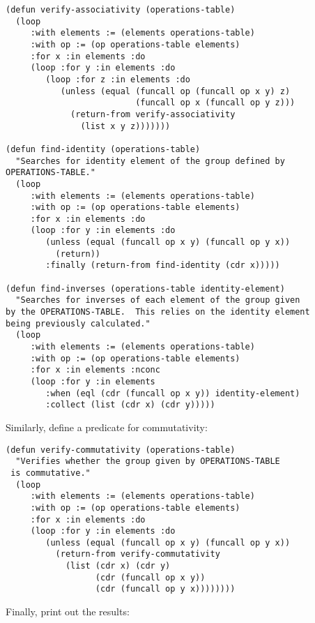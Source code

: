 \documentclass[11pt]{article}
\begin{document}
\lstset{language=Lisp,numbers=none}
\begin{lstlisting}
(defun verify-associativity (operations-table)
  (loop
     :with elements := (elements operations-table)
     :with op := (op operations-table elements)
     :for x :in elements :do
     (loop :for y :in elements :do
        (loop :for z :in elements :do
           (unless (equal (funcall op (funcall op x y) z)
                          (funcall op x (funcall op y z)))
             (return-from verify-associativity
               (list x y z)))))))

(defun find-identity (operations-table)
  "Searches for identity element of the group defined by
OPERATIONS-TABLE."
  (loop
     :with elements := (elements operations-table)
     :with op := (op operations-table elements)
     :for x :in elements :do
     (loop :for y :in elements :do
        (unless (equal (funcall op x y) (funcall op y x))
          (return))
        :finally (return-from find-identity (cdr x)))))

(defun find-inverses (operations-table identity-element)
  "Searches for inverses of each element of the group given
by the OPERATIONS-TABLE.  This relies on the identity element
being previously calculated."
  (loop
     :with elements := (elements operations-table)
     :with op := (op operations-table elements)
     :for x :in elements :nconc
     (loop :for y :in elements
        :when (eql (cdr (funcall op x y)) identity-element)
        :collect (list (cdr x) (cdr y)))))
\end{lstlisting}

Similarly, define a predicate for commutativity:

\lstset{language=Lisp,numbers=none}
\begin{lstlisting}
(defun verify-commutativity (operations-table)
  "Verifies whether the group given by OPERATIONS-TABLE
 is commutative."
  (loop
     :with elements := (elements operations-table)
     :with op := (op operations-table elements)
     :for x :in elements :do
     (loop :for y :in elements :do
        (unless (equal (funcall op x y) (funcall op y x))
          (return-from verify-commutativity
            (list (cdr x) (cdr y) 
                  (cdr (funcall op x y))
                  (cdr (funcall op y x))))))))
\end{lstlisting}

Finally, print out the results:
\end{document}
